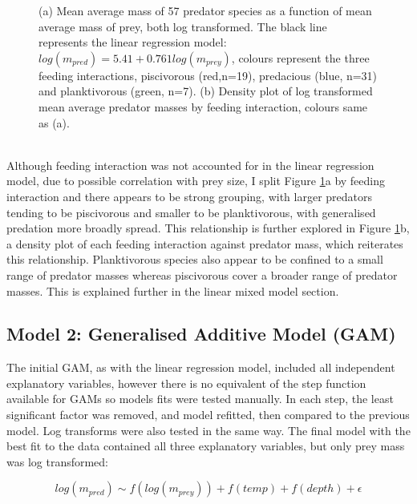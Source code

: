 \documentclass[11pt,a4paper]{article}
\begin{document}
\begin{figure}[H]
\begin{subfigure}[t]{0.45\linewidth}
			\caption{}
		\end{subfigure}
		\caption{(a) Mean average mass of 57 predator species as a function of mean average mass of prey, both log transformed. The black line represents the linear regression model: $log(m_{pred}) = 5.41 + 0.761log(m_{prey})$, colours represent the three feeding interactions, piscivorous (red,n=19), predacious (blue, n=31) and planktivorous (green, n=7). (b) Density plot of log transformed mean average predator masses by feeding interaction, colours same as (a).}
		\label{fig:linmod}
	\end{figure}
	
	\par \noindent ~\\ Although feeding interaction was not accounted for in the linear regression model, due to possible correlation with prey size, I split Figure \ref{fig:linmod}a by feeding interaction and there appears to be strong grouping, with larger predators tending to be piscivorous and smaller to be planktivorous, with generalised predation more broadly spread. This relationship is further explored in Figure \ref{fig:linmod}b, a density plot of each feeding interaction against predator mass, which reiterates this relationship. Planktivorous species also appear to be confined to a small range of predator masses whereas piscivorous cover a broader range of predator masses. This is explained further in the linear mixed model section.
		
	\subsection{Model 2: Generalised Additive Model (GAM)}
	
	\par \noindent The initial GAM, as with the linear regression model, included all independent explanatory variables, however there is no equivalent of the step function available for GAMs so models fits were tested manually. In each step, the least significant factor was removed, and model refitted, then compared to the previous model. Log transforms were also tested in the same way. The final model with the best fit to the data contained all three explanatory variables, but only prey mass was log transformed:
	
	\begin{equation*}
		log(m_{pred}) \sim f(log(m_{prey})) + f(temp) + f(depth) + \epsilon
	\end{equation*}
	
\end{document}
